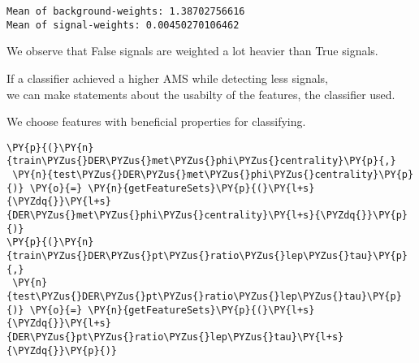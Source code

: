 \par\vspace{1\smallerfontscale}%
    \begin{addmargin}[\cellleftmargin]{0em}%
    {\smaller%
    \vspace{-1\smallerfontscale}%
    
    \begin{Verbatim}[commandchars=\\\{\}]
Mean of background-weights: 1.38702756616
Mean of signal-weights: 0.00450270106462
    \end{Verbatim}
}%
    \end{addmargin}%
    We observe that False signals are weighted a lot heavier than True
signals.

    If a classifier achieved a higher AMS while detecting less signals,\\
we can make statements about the usabilty of the features, the
classifier used.

We choose features with beneficial properties for classifying.


{\par%
\vspace{-1\baselineskip}%
}%
\begin{notebookcell}[]%
\begin{addmargin}[\cellleftmargin]{0em}%
{\smaller%
\par%
%
\vspace{-1\smallerfontscale}%
\begin{Verbatim}[commandchars=\\\{\}]
\PY{p}{(}\PY{n}{train\PYZus{}DER\PYZus{}met\PYZus{}phi\PYZus{}centrality}\PY{p}{,}
 \PY{n}{test\PYZus{}DER\PYZus{}met\PYZus{}phi\PYZus{}centrality}\PY{p}{)} \PY{o}{=} \PY{n}{getFeatureSets}\PY{p}{(}\PY{l+s}{\PYZdq{}}\PY{l+s}{DER\PYZus{}met\PYZus{}phi\PYZus{}centrality}\PY{l+s}{\PYZdq{}}\PY{p}{)}
\PY{p}{(}\PY{n}{train\PYZus{}DER\PYZus{}pt\PYZus{}ratio\PYZus{}lep\PYZus{}tau}\PY{p}{,}
 \PY{n}{test\PYZus{}DER\PYZus{}pt\PYZus{}ratio\PYZus{}lep\PYZus{}tau}\PY{p}{)} \PY{o}{=} \PY{n}{getFeatureSets}\PY{p}{(}\PY{l+s}{\PYZdq{}}\PY{l+s}{DER\PYZus{}pt\PYZus{}ratio\PYZus{}lep\PYZus{}tau}\PY{l+s}{\PYZdq{}}\PY{p}{)}
\end{Verbatim}
%
\par%
\vspace{-1\smallerfontscale}}%
\end{addmargin}
\end{notebookcell}



